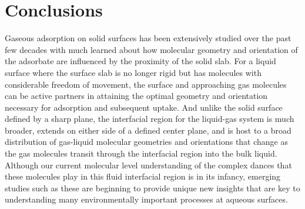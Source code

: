 \documentclass{article}
\begin{document}


\section {Conclusions}

Gaseous adsorption on solid surfaces has been extensively studied over the past few decades with much learned about how molecular geometry and orientation of the adsorbate are influenced by the proximity of the solid slab.  For a liquid surface where the surface slab is no longer rigid but has molecules with considerable freedom of movement, the surface and approaching gas molecules can be active partners in attaining the optimal geometry and orientation necessary for adsorption and subsequent uptake.    And unlike the solid surface defined by a sharp plane, the interfacial region for the liquid-gas system is much broader, extends on either side of a defined center plane, and is host to a broad distribution of gas-liquid molecular geometries and orientations that change as the gas molecules transit through the interfacial region into the bulk liquid.  Although  our current molecular level understanding of  the complex dances that these molecules play in this fluid interfacial region is in its infancy, emerging studies such as these are beginning to provide unique new insights that are key to understanding many  environmentally important processes at aqueous surfaces.
\end{document}
